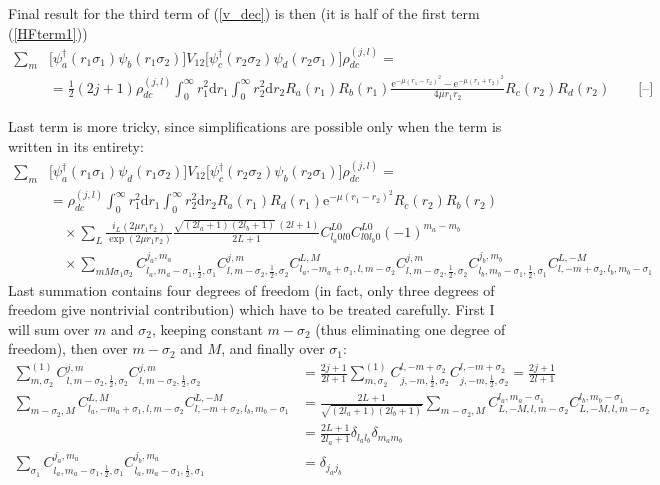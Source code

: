 \documentclass[10pt,a4paper]{article}
\begin{document}
Final result for the third term of (\ref{v_dec}) is then (it is half of the first term (\ref{HFterm1}))
\begin{align}
\sum_m &\big[\psi_a^\dagger(r_1\sigma_1)\psi_b(r_1\sigma_2)\big]V_{12}
\big[\psi_c^\dagger(r_2\sigma_2)\psi_d(r_2\sigma_1)\big]\rho_{dc}^{(j,l)} =\nonumber\\
&= \frac{1}{2} (2j+1)\rho_{dc}^{(j,l)} \int_0^\infty r_1^2\mathrm{d}r_1
\int_0^\infty r_2^2\mathrm{d}r_2 R_a(r_1) R_b(r_1)
\frac{\mathrm{e}^{-\mu(r_1-r_2)^2}-\mathrm{e}^{-\mu(r_1+r_2)^2}}{4\mu r_1 r_2}
R_c(r_2) R_d(r_2) \qquad \textbf{[--]}
\end{align}

Last term is more tricky, since simplifications are possible only when the term is written in its entirety:
\begin{align}
\sum_m &\big[\psi_a^\dagger(r_1\sigma_1)\psi_d(r_1\sigma_2)\big]V_{12}
\big[\psi_c^\dagger(r_2\sigma_2)\psi_b(r_2\sigma_1)\big]\rho_{dc}^{(j,l)} =\nonumber\\
&= \rho_{dc}^{(j,l)}\int_0^\infty r_1^2\mathrm{d}r_1
\int_0^\infty r_2^2\mathrm{d}r_2 R_a(r_1) R_d(r_1)
\mathrm{e}^{-\mu(r_1-r_2)^2} R_c(r_2) R_b(r_2) \\
&\quad\times\sum_L \frac{i_L(2\mu r_1 r_2)}{\exp(2\mu r_1 r_2)}
\frac{\sqrt{(2l_a+1)(2l_b+1)}\,(2l+1)}{2L+1}
C_{l_a 0 l 0}^{L0} C_{l 0 l_b 0}^{L0} (-1)^{m_a-m_b} \nonumber\\
&\quad\times\sum_{mM\sigma_1\sigma_2}
C_{l_a,m_a-\sigma_1,\frac{1}{2},\sigma_1}^{j_a,m_a}
C_{l,m-\sigma_2,\frac{1}{2},\sigma_2}^{j,m}
C_{l_a,-m_a+\sigma_1,l,m-\sigma_2}^{L,M}
C_{l,m-\sigma_2,\frac{1}{2},\sigma_2}^{j,m}
C_{l_b,m_b-\sigma_1,\frac{1}{2},\sigma_1}^{j_b,m_b}
C_{l,-m+\sigma_2,l_b,m_b-\sigma_1}^{L,-M} \nonumber
\end{align}
Last summation contains four degrees of freedom (in fact, only three degrees of freedom give nontrivial contribution) which have to be treated carefully. First I will sum over $m$ and $\sigma_2$, keeping constant $m-\sigma_2$ (thus eliminating one degree of freedom), then over $m-\sigma_2$ and $M$, and finally over $\sigma_1$:
\begin{subequations}
\begin{align}
\sum_{m,\sigma_2}^{(1)} C_{l,m-\sigma_2,\frac{1}{2},\sigma_2}^{j,m}
C_{l,m-\sigma_2,\frac{1}{2},\sigma_2}^{j,m} &=
\frac{2j+1}{2l+1}\sum_{m,\sigma_2}^{(1)}
C_{j,-m,\frac{1}{2},\sigma_2}^{l,-m+\sigma_2}
C_{j,-m,\frac{1}{2},\sigma_2}^{l,-m+\sigma_2} = \frac{2j+1}{2l+1} \\
\sum_{m-\sigma_2,M} C_{l_a,-m_a+\sigma_1,l,m-\sigma_2}^{L,M}
C_{l,-m+\sigma_2,l_b,m_b-\sigma_1}^{L,-M} &= \frac{2L+1}{\sqrt{(2l_a+1)(2l_b+1)}}
\sum_{m-\sigma_2,M} C_{L,-M,l,m-\sigma_2}^{l_a,m_a-\sigma_1}
C_{L,-M,l,m-\sigma_2}^{l_b,m_b-\sigma_1} \nonumber\\
&= \frac{2L+1}{2l_a+1}\delta_{l_a l_b} \delta_{m_a m_b} \\
\sum_{\sigma_1} C_{l_a,m_a-\sigma_1,\frac{1}{2},\sigma_1}^{j_a,m_a}
C_{l_a,m_a-\sigma_1,\frac{1}{2},\sigma_1}^{j_b,m_a} &= \delta_{j_a j_b}
\end{align}
\end{subequations}
\end{document}
